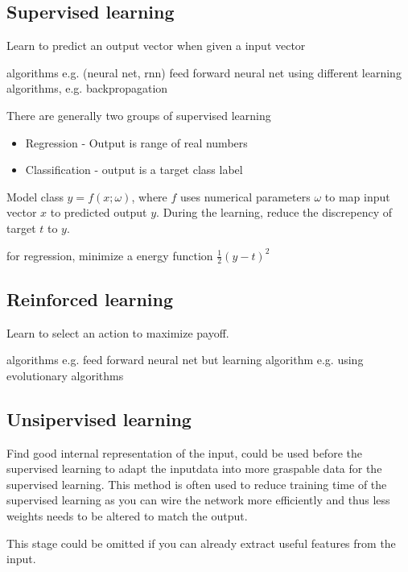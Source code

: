 \subsection{Supervised learning}

Learn to predict an output vector when given a input vector

algorithms
e.g. (neural net, rnn) feed forward neural net using different learning algorithms, e.g. backpropagation


There are generally two groups of supervised learning

\begin{itemize}
\item Regression - Output is range of real numbers
\item Classification - output is a target class label
\end{itemize}

Model class $y=f(x;\omega)$, where $f$ uses numerical parameters $\omega$ to map input vector $x$ to predicted output $y$. During the learning, reduce the discrepency of target $t$ to $y$.

for regression, minimize a energy function $\frac{1}{2}\left(y-t\right)^2$

\subsection{Reinforced learning}

Learn to select an action to maximize payoff.

algorithms
e.g. feed forward neural net but learning algorithm e.g. using evolutionary algorithms



\subsection{Unsipervised learning}

Find good internal representation of the input, could be used before the supervised learning to adapt the inputdata into more graspable data for the supervised learning. This method is often used to reduce training time of the supervised learning as you can wire the network more efficiently and thus less weights needs to be altered to match the output.

This stage could be omitted if you can already extract useful features from the input.





